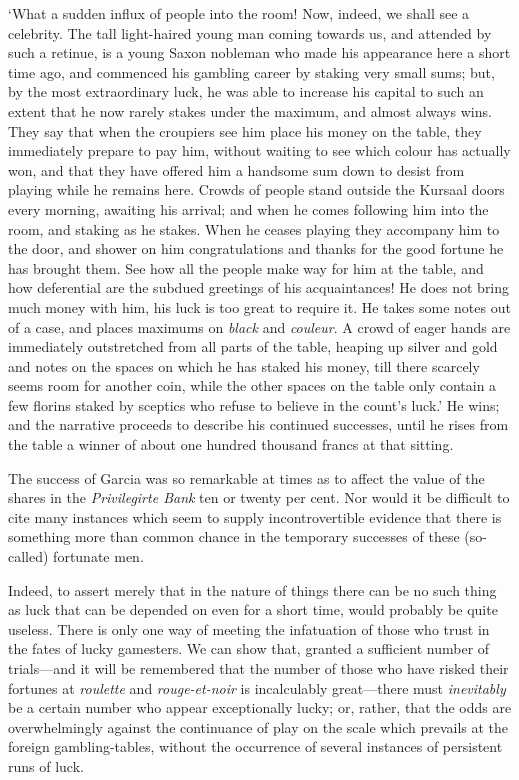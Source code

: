 \documentclass[letterpaper,12pt,oneside,openany]{memoir}
\begin{document}
`What a sudden influx of people into the room!
Now, indeed, we shall see a celebrity. The tall light-haired
young man coming towards us, and attended by
such a retinue, is a young Saxon nobleman who made
his appearance here a short time ago, and commenced
his gambling career by staking very small sums; but,
by the most extraordinary luck, he was able to increase
his capital to such an extent that he now rarely stakes
under the maximum, and almost always wins. They
say that when the croupiers see him place his money
on the table, they immediately prepare to pay him,
without waiting to see which colour has actually won,
and that they have offered him a handsome sum down
to desist from playing while he remains here. Crowds
of people stand outside the Kursaal doors every
morning, awaiting his arrival; and when he comes
following him into the room, and staking as he stakes.
When he ceases playing they accompany him to the
door, and shower on him congratulations and thanks
for the good fortune he has brought them. See how
all the people make way for him at the table, and how
deferential are the subdued greetings of his acquaintances!
He does not bring much money with him,
his luck is too great to require it. He takes some
notes out of a case, and places maximums on \textit{black} and
\textit{couleur}. A crowd of eager hands are immediately outstretched
from all parts of the table, heaping up silver
and gold and notes on the spaces on which he has
staked his money, till there scarcely seems room for
another coin, while the other spaces on the table only
contain a few florins staked by sceptics who refuse to
believe in the count's luck.' He wins; and the narrative
proceeds to describe his continued successes, until
he rises from the table a winner of about one hundred
thousand francs at that sitting.

The success of Garcia was so remarkable at times as
to affect the value of the shares in the \textit{Privilegirte
Bank} ten or twenty per cent. Nor would it be difficult
to cite many instances which seem to supply incontrovertible
evidence that there is something more than
common chance in the temporary successes of these (so-called)
fortunate men.

Indeed, to assert merely that in the nature of things
there can be no such thing as luck that can be depended
on even for a short time, would probably be quite
useless. There is only one way of meeting the infatuation
of those who trust in the fates of lucky gamesters.
We can show that, granted a sufficient number of
trials---and it will be remembered that the number of
those who have risked their fortunes at \textit{roulette} and
\textit{rouge-et-noir} is incalculably great---there must \textit{inevitably}
be a certain number who appear exceptionally
lucky; or, rather, that the odds are overwhelmingly
against the continuance of play on the scale which
prevails at the foreign gambling-tables, without the
occurrence of several instances of persistent runs of luck.
\end{document}
